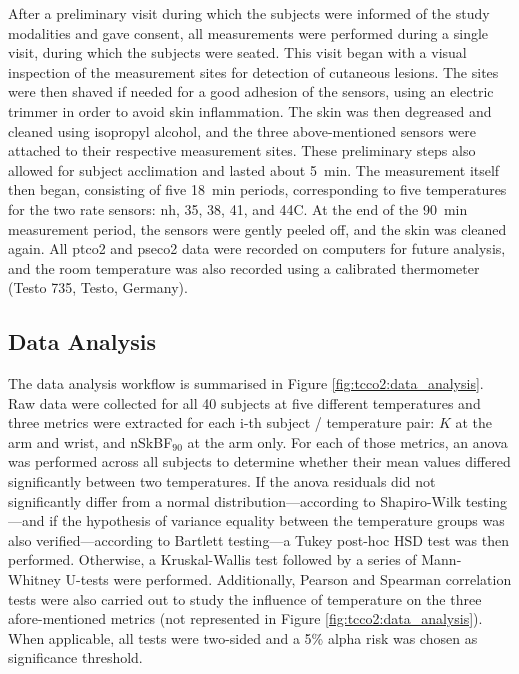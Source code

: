 After a preliminary visit during which the subjects were informed of the study modalities and gave consent, all measurements were performed during a single visit, during which the subjects were seated. This visit began with a visual inspection of the measurement sites for detection of cutaneous lesions. The sites were then shaved if needed for a good adhesion of the sensors, using an electric trimmer in order to avoid skin inflammation. The skin was then degreased and cleaned using isopropyl alcohol, and the three above-mentioned sensors were attached to their respective measurement sites. These preliminary steps also allowed for subject acclimation and lasted about 5~min. The measurement itself then began, consisting of five 18~min periods, corresponding to five temperatures for the two rate sensors: \gls{nh}, 35, 38, 41, and 44{\degree}C. At the end of the 90~min measurement period, the sensors were gently peeled off, and the skin was cleaned again. All \gls{ptco2} and \gls{pseco2} data were recorded on computers for future analysis, and the room temperature was also recorded using a calibrated thermometer (Testo 735, Testo, Germany).

\subsection{Data Analysis}\label{subsect:tcco2:data_anal}

The data analysis workflow is summarised in Figure \ref{fig:tcco2:data_analysis}. Raw data were collected for all 40 subjects at five different temperatures and three metrics were extracted for each i-th subject / temperature pair: $K$ at the arm and wrist, and nSkBF$_{90}$ at the arm only. For each of those metrics, an \gls{anova} was performed across all subjects to determine whether their mean values differed significantly between two temperatures. If the \gls{anova} residuals did not significantly differ from a normal distribution---according to Shapiro-Wilk testing---and if the hypothesis of variance equality between the temperature groups was also verified---according to Bartlett testing---a Tukey post-hoc HSD test was then performed. Otherwise, a Kruskal-Wallis test followed by a series of Mann-Whitney U-tests were performed. Additionally, Pearson and Spearman correlation tests were also carried out to study the influence of temperature on the three afore-mentioned metrics (not represented in Figure \ref{fig:tcco2:data_analysis}). When applicable, all tests were two-sided and a 5\% alpha risk was chosen as significance threshold.

